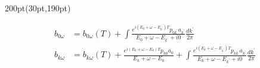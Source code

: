 \begin{frame}
\begin{textblock*}{200pt}(30pt,190pt)
\footnotesize

\begin{align}
b_{0\omega} & = b_{0\omega}(T)
 +\int\frac{e^{i(E_0+\omega-E_{k^\prime})T}p_{0k^\prime}a_{k^\prime}}
{E_0+\omega-E_{k^\prime} + i0} \frac{dk^\prime}{2\pi} \nonumber\\
b_{k\omega} & = b_{k\omega}(T)
 +\frac{e^{i(E_k+\omega-E_0)T}p_{k0}a_0}{E_k+\omega-E_0}
 +\int\frac{e^{i(E_k+\omega-E_{k^\prime})T}p_{kk^\prime}a_{k^\prime}}
{E_k+\omega-E_{k^\prime} + i0} \frac{dk^\prime}{2\pi} \nonumber
\end{align}


\end{textblock*}



\end{frame}



